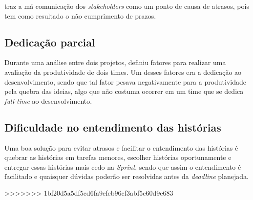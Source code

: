   \cite{leo2013} traz a má comunicação dos \textit{stakeholders} como um ponto de causa de atrasos, pois tem como resultado
  o não cumprimento de prazos.
  
  \subsection{Dedicação parcial}
  
  Durante uma análise entre dois projetos, \cite{melo2011} definiu fatores para realizar uma avaliação da produtividade de 
  dois times. Um desses fatores era a dedicação ao desenvolvimento, sendo que tal fator pesava negativamente para a produtividade
  pela quebra das ideias, algo que não costuma ocorrer em um time que se dedica \textit{full-time} ao desenvolvimento.
  
  \subsection{Dificuldade no entendimento das histórias}
  
  Uma boa solução para evitar atrasos e facilitar o entendimento das histórias é quebrar as histórias em tarefas menores, 
  escolher histórias oportunamente e entregar essas histórias mais cedo na \textit{Sprint}, sendo que assim o entendimento 
  é facilitado e quaisquer dúvidas poderão ser resolvidas antes da \textit{deadline} planejada. \cite{cogn2011}
  
>>>>>>> 1bf20d5a5df5cd6fa9efeb96cf3abf5c60d9e683
